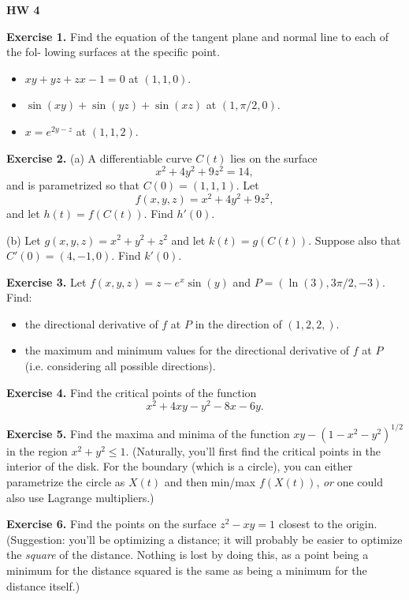 \documentclass{article}
\begin{document}

\textbf{HW 4}

\textbf{Exercise 1.} Find the equation of the tangent plane and normal line to each of the fol-
lowing surfaces at the specific point.
\begin{itemize}
    \item $xy+yz+zx-1=0$ at $(1,1,0)$.
    \item $\sin(xy) + \sin(yz) + \sin(xz)$ at $(1,\pi/2,0)$.
    \item $x=e^{2y-z}$ at $(1,1,2)$.
\end{itemize}

\textbf{Exercise 2.} 
(a) A differentiable curve $C(t)$ lies on the surface
\[x^2 + 4y^2 + 9z^2 = 14,\]
and is parametrized so that $C(0) = (1,1,1)$. Let 
\[f(x,y,z) = x^2 + 4y^2 + 9z^2,\]
and let $h(t) = f(C(t))$. Find $h'(0)$.

(b) Let $g(x,y,z) = x^2 + y^2 + z^2$ and let $k(t) = g(C(t))$.
Suppose also that $C'(0)=(4,-1,0)$. Find $k'(0)$.

\textbf{Exercise 3.} 
Let $f(x,y,z) = z - e^x \sin(y)$ and $P=(\ln(3), 3\pi/2, -3)$.
Find:
\begin{itemize}
    \item the directional derivative of $f$ at $P$ in the direction of $(1,2,2,)$.
    \item the maximum and minimum values for the directional derivative of $f$ at $P$ (i.e. considering all possible directions).
\end{itemize}

\textbf{Exercise 4.} 
Find the critical points of the function
\[x^2+4xy-y^2-8x-6y.\]

\textbf{Exercise 5.}
Find the maxima and minima of the function $xy - (1-x^2-y^2)^{1/2}$ in the region
$x^2+y^2 \leq 1$. (Naturally, you'll first find the critical points 
in the interior of the disk. For the boundary (which is a circle), you can either parametrize
the circle as $X(t)$ and then min/max $f(X(t))$, \emph{or} one could also
use Lagrange multipliers.)

\textbf{Exercise 6.} Find the points on the surface $z^2 - xy = 1$ closest to the origin.
(Suggestion: you'll be optimizing a distance; it will probably be easier to optimize the \emph{square}
of the distance. Nothing is lost by doing this, as a point being a minimum for the distance squared is the
same as being a minimum for the distance itself.)
\end{document}
